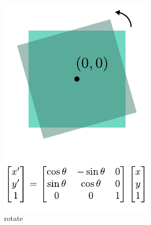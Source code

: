 \begin{figure}[t]
\begin{subfigure}[t]{0.195\linewidth}
        \includegraphics[width=\linewidth]{imgs/rotate_affine.pdf}
        \caption{\label{fig:rotate_affine} rotate}
    \end{subfigure}
    \begin{subfigure}[t]{0.195\linewidth}
        \centering

\end{subfigure}
\end{figure}
